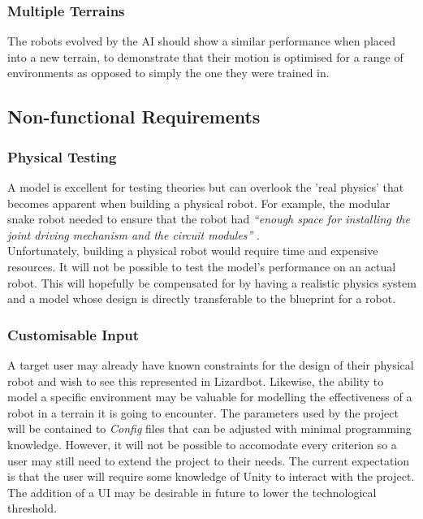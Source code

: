 \documentclass{article}
\begin{document}
\subsubsection{Multiple Terrains}
\label{sec:Multiple Terrains}
The robots evolved by the AI should show a similar performance when placed into a new terrain, to demonstrate that their motion is optimised for a range of environments as opposed to simply the one they were trained in.

\subsection{Non-functional Requirements}
\label{sec:Non-functional Requirements}
\subsubsection{Physical Testing}
\label{sec:Physical Testing}
A model is excellent for testing theories but can overlook the 'real physics' that becomes apparent when building a physical robot. For example, the modular snake robot needed to ensure that the robot had \textit{“enough space for installing the joint driving mechanism and the circuit modules”} . \\
Unfortunately, building a physical robot would require time and expensive resources. It will not be possible to test the model’s performance on an actual robot. This will hopefully be compensated for by having a realistic physics system and a model whose design is directly transferable to the blueprint for a robot.

\subsubsection{Customisable Input}
\label{sec:Customisable Input}
A target user may already have known constraints for the design of their physical robot and wish to see this represented in Lizardbot. Likewise, the ability to model a specific environment may be valuable for modelling the effectiveness of a robot in a terrain it is going to encounter.
The parameters used by the project will be contained to \textit{Config} files that can be adjusted with minimal programming knowledge. However, it will not be possible to accomodate every criterion so a user may still need to extend the project to their needs. 
The current expectation is that the user will require some knowledge of Unity to interact with the project. The addition of a UI may be desirable in future to lower the technological threshold. 
\end{document}
